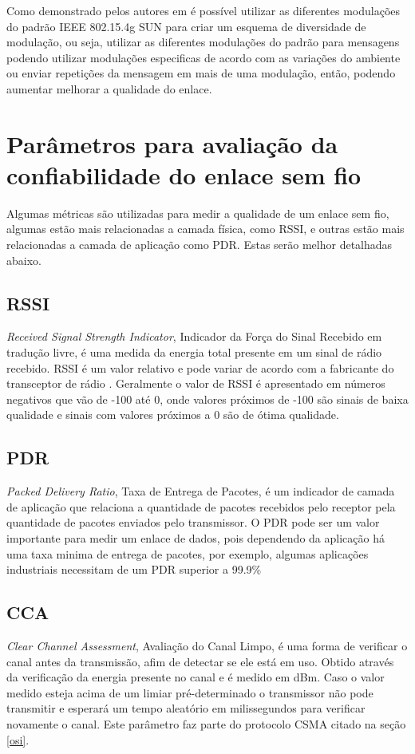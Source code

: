 Como demonstrado pelos autores em \cite{gomes2020improving} é possível utilizar as diferentes modulações do padrão IEEE 802.15.4g SUN para criar um esquema de diversidade de modulação, ou seja, utilizar as diferentes modulações do padrão para mensagens podendo utilizar modulações especificas de acordo com as variações do ambiente ou enviar repetições da mensagem em mais de uma modulação, então, podendo aumentar melhorar a qualidade do enlace.

\section{Parâmetros para avaliação da confiabilidade do enlace sem fio}
\label{paramSF}
Algumas métricas são utilizadas para medir a qualidade de um enlace sem fio, algumas estão mais relacionadas a camada física, como RSSI, e outras estão mais relacionadas a camada de aplicação como PDR. Estas serão melhor detalhadas abaixo.
\subsection*{RSSI}
\emph{Received Signal Strength Indicator}, Indicador da Força do Sinal Recebido em tradução livre, é uma medida da energia total presente em um sinal de rádio recebido. RSSI é um valor relativo e pode variar de acordo com a fabricante do transceptor de rádio \cite{UNDERSTANDING_RSSI}. Geralmente o valor de RSSI é apresentado em números negativos que vão de -100 até 0, onde valores próximos de -100 são sinais de baixa qualidade e sinais com valores próximos a 0 são de ótima qualidade.

\subsection*{PDR}
\emph{Packed Delivery Ratio}, Taxa de Entrega de Pacotes, é um indicador de camada de aplicação que relaciona a quantidade de pacotes recebidos pelo receptor pela quantidade de pacotes enviados pelo transmissor. O PDR pode ser um valor importante para medir um enlace de dados, pois dependendo da aplicação há uma taxa minima de entrega de pacotes, por exemplo, algumas aplicações industriais necessitam de um PDR superior a 99.9\%

\subsection*{CCA}
\emph{Clear Channel Assessment}, Avaliação do Canal Limpo, é uma forma de verificar o canal antes da transmissão, afim de detectar se ele está em uso. Obtido através da verificação da energia presente no canal e é medido em dBm. Caso o valor medido esteja acima de um limiar pré-determinado o transmissor não pode transmitir e esperará um tempo aleatório em milissegundos para verificar novamente o canal. Este parâmetro faz parte do protocolo CSMA citado na seção \ref{osi}.

